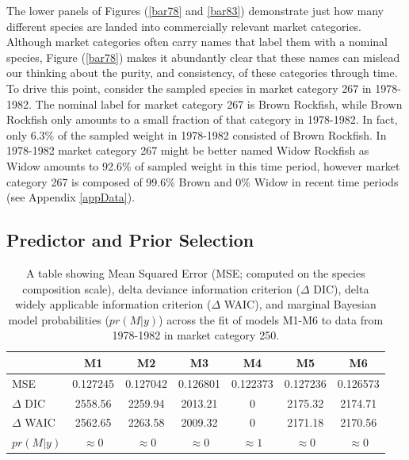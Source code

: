 \documentclass[12pt]{article}
\begin{document}
The lower panels of Figures (\ref{bar78} and \ref{bar83}) demonstrate just how
many different species are landed into commercially relevant market
categories. Although market categories often carry names that label them
with a nominal species, Figure (\ref{bar78}) makes it abundantly clear that
these names can mislead our thinking about the purity, and consistency,
of these categories through time. To drive this point, consider the
sampled species in market category 267 in 1978-1982. The nominal label
for market category 267 is Brown Rockfish, while Brown Rockfish only
amounts to a small fraction of that category in 1978-1982. In fact, only
6.3\% of the sampled weight in 1978-1982 consisted of Brown Rockfish. In
1978-1982 market category 267 might be better named Widow Rockfish as
Widow amounts to 92.6\% of sampled weight in this time period, however
market category 267 is composed of 99.6\% Brown and 0\% Widow in recent
time periods (see Appendix \ref{appData}).

\subsection{Predictor and Prior Selection}\label{predictor-and-prior-selection}

\begin{table}[h!]
\centering
\begin{tabular}[c]{@{}lcccccc@{}}
\hline
& M1 & M2 & M3 & M4 & M5 & M6 \\ \hline
MSE & 0.127245 & 0.127042 & 0.126801 & 0.122373 & 0.127236 & 0.126573 \\ %
\(\Delta\) DIC & 2558.56 & 2259.94 & 2013.21 & 0 & 2175.32 & 2174.71 \\ %
\(\Delta\) WAIC & 2562.65 & 2263.58 & 2009.32 & 0 & 2171.18 & 2170.56 \\ %
\(pr(M|y)\) & \(\approx0\) & \(\approx0\) & \(\approx0\) & \(\approx1\) & \(\approx0\) & \(\approx0\) \\ \hline
\end{tabular}
\caption{A table showing Mean Squared Error (MSE; computed on the species
composition scale), delta deviance information criterion (\(\Delta\) DIC),
delta widely applicable information criterion (\(\Delta\) WAIC), and marginal
Bayesian model probabilities (\(pr(M|y)\)) across the fit of models M1-M6 to 
data from 1978-1982 in market category 250.}
\label{priorTab}
\end{table}
\end{document}

